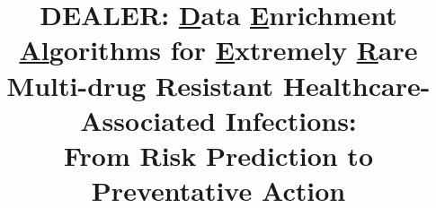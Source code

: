 \documentclass{NSF}
\begin{document}

\title{DEALER: \underline{D}ata \underline{E}nrichment \underline{Al}gorithms for \underline{E}xtremely \underline{R}are Multi-drug Resistant Healthcare-Associated Infections:\\ From Risk Prediction to Preventative Action}



\newpage{}


\newpage{}
\renewcommand\refname{References Cited}



\newpage{}


\newpage{}


\newpage{}


\newpage{}


\newpage{}
\end{document}
